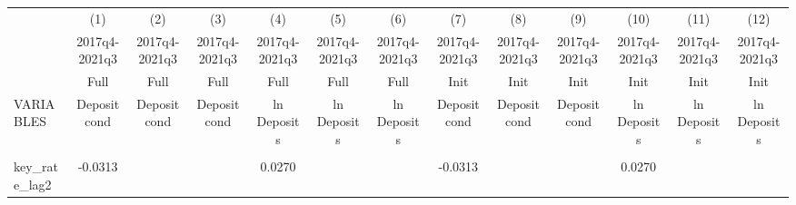 \documentclass[]{article}
\begin{document}
\begin{center}
\begin{tabular}{lcccccccccccc} \hline
 & (1) & (2) & (3) & (4) & (5) & (6) & (7) & (8) & (9) & (10) & (11) & (12) \\
 & 2017q4-2021q3 & 2017q4-2021q3 & 2017q4-2021q3 & 2017q4-2021q3 & 2017q4-2021q3 & 2017q4-2021q3 & 2017q4-2021q3 & 2017q4-2021q3 & 2017q4-2021q3 & 2017q4-2021q3 & 2017q4-2021q3 & 2017q4-2021q3 \\
 & Full & Full & Full & Full & Full & Full & Init & Init & Init & Init & Init & Init \\
VARIABLES & Deposit cond & Deposit cond & Deposit cond & ln Deposits & ln Deposits & ln Deposits & Deposit cond & Deposit cond & Deposit cond & ln Deposits & ln Deposits & ln Deposits \\ \hline
\vspace{4pt} & \begin{footnotesize}\end{footnotesize} & \begin{footnotesize}\end{footnotesize} & \begin{footnotesize}\end{footnotesize} & \begin{footnotesize}\end{footnotesize} & \begin{footnotesize}\end{footnotesize} & \begin{footnotesize}\end{footnotesize} & \begin{footnotesize}\end{footnotesize} & \begin{footnotesize}\end{footnotesize} & \begin{footnotesize}\end{footnotesize} & \begin{footnotesize}\end{footnotesize} & \begin{footnotesize}\end{footnotesize} & \begin{footnotesize}\end{footnotesize} \\
key\_rate\_lag2 & -0.0313 &  &  & 0.0270 &  &  & -0.0313 &  &  & 0.0270 &  &  \\

\end{tabular}
\end{center}
\end{document}
